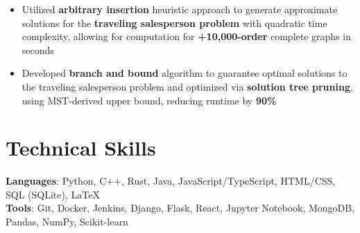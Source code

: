 \documentclass[letterpaper,11pt]{article}
\begin{document}
\begin{itemize}
    \item Utilized \textbf{arbitrary insertion} heuristic approach to generate
          approximate solutions for the \textbf{traveling salesperson problem} with
          quadratic time complexity, allowing for computation for \textbf{+10,000-order}
          complete graphs in seconds
    \item Developed \textbf{branch and bound} algorithm to guarantee optimal solutions to
          the traveling salesperson problem and optimized via \textbf{solution tree
              pruning}, using MST-derived upper bound, reducing runtime by \textbf{90\%}
\end{itemize}
\section{Technical Skills}
\textbf{Languages}: Python, C++, Rust, Java, JavaScript/TypeScript, HTML/CSS,
SQL (SQLite), \LaTeX \\
\textbf{Tools}: Git, Docker, Jenkins, Django, Flask, React,
Jupyter Notebook, MongoDB, Pandas, NumPy, Scikit-learn
\end{document}
